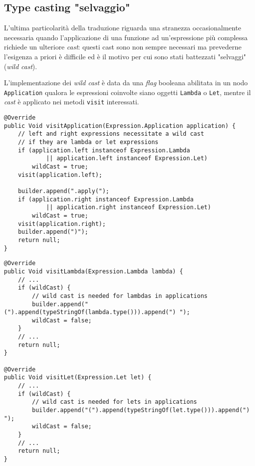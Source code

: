 \subsection{Type casting "selvaggio"}
\label{sec:5-15-wild-type-casting}

L'ultima particolarità della traduzione riguarda una stranezza occasionalmente necessaria quando l'applicazione
di una funzione ad un'espressione più complessa richiede un ulteriore \textit{cast}: questi cast sono non sempre necessari
ma prevederne l'esigenza a priori è difficile ed è il motivo per cui sono stati battezzati "selvaggi" (\textit{wild cast}).


L'implementazione dei \textit{wild cast} è data da una \textit{flag} booleana abilitata in un nodo \texttt{Application}
qualora le espressioni coinvolte siano oggetti \texttt{Lambda} o \texttt{Let}, mentre il \textit{cast} è applicato
nei metodi \texttt{visit} interessati.

\vspace{4mm}
\begin{lstlisting}[caption={Metodo \texttt{visit} per le applicazioni di funzione}, style=javaCode, label={lst:5-15-visit-application-java}]
@Override
public Void visitApplication(Expression.Application application) {
    // left and right expressions necessitate a wild cast
    // if they are lambda or let expressions
    if (application.left instanceof Expression.Lambda
            || application.left instanceof Expression.Let)
        wildCast = true;
    visit(application.left);

    builder.append(".apply(");
    if (application.right instanceof Expression.Lambda
            || application.right instanceof Expression.Let)
        wildCast = true;
    visit(application.right);
    builder.append(")");
    return null;
}
\end{lstlisting}
\vspace{4mm}
\begin{lstlisting}[caption={\textit{Wild cast} in espressioni \texttt{lambda} e \texttt{let}}, style=javaCode, label={lst:5-15-wild-casts-java}]
@Override
public Void visitLambda(Expression.Lambda lambda) {
    // ...
    if (wildCast) {
        // wild cast is needed for lambdas in applications
        builder.append("(").append(typeStringOf(lambda.type())).append(") ");
        wildCast = false;
    }
    // ...
    return null;
}

@Override
public Void visitLet(Expression.Let let) {
    // ...
    if (wildCast) {
        // wild cast is needed for lets in applications
        builder.append("(").append(typeStringOf(let.type())).append(") ");
        wildCast = false;
    }
    // ...
    return null;
}
\end{lstlisting}

